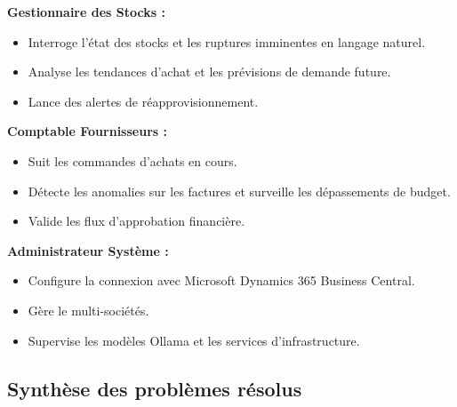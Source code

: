 \textbf{Gestionnaire des Stocks :}
\begin{itemize}
    \item Interroge l'état des stocks et les ruptures imminentes en langage naturel.
    \item Analyse les tendances d'achat et les prévisions de demande future.
    \item Lance des alertes de réapprovisionnement.
\end{itemize}

\textbf{Comptable Fournisseurs :}
\begin{itemize}
    \item Suit les commandes d'achats en cours.
    \item Détecte les anomalies sur les factures et surveille les dépassements de budget.
    \item Valide les flux d'approbation financière.
\end{itemize}

\textbf{Administrateur Système :}
\begin{itemize}
    \item Configure la connexion avec Microsoft Dynamics 365 Business Central.
    \item Gère le multi-sociétés.
    \item Supervise les modèles Ollama et les services d'infrastructure.
\end{itemize}

\subsection{Synthèse des problèmes résolus}

